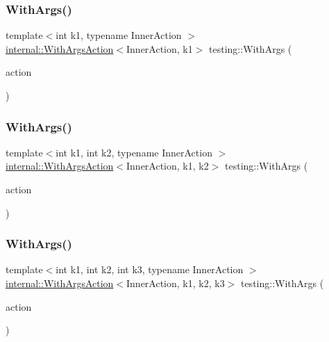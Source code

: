 \mbox{\label{namespacetesting_a3bd9eef13bee9065b19d3cd571829c7c}} 
\subsubsection{\texorpdfstring{WithArgs()}{WithArgs()}\hspace{0.1cm}{\footnotesize\ttfamily [1/11]}}
{\footnotesize\ttfamily template$<$int k1, typename Inner\+Action $>$ \\
\mbox{\hyperlink{structtesting_1_1internal_1_1_with_args_action}{internal\+::\+With\+Args\+Action}}$<$Inner\+Action, k1$>$ testing\+::\+With\+Args (\begin{DoxyParamCaption}\item[{const Inner\+Action \&}]{action }\end{DoxyParamCaption})\hspace{0.3cm}{\ttfamily [inline]}}

\mbox{\label{namespacetesting_aa82fc09250ba172220e6fb7e77249e74}} 
\subsubsection{\texorpdfstring{WithArgs()}{WithArgs()}\hspace{0.1cm}{\footnotesize\ttfamily [2/11]}}
{\footnotesize\ttfamily template$<$int k1, int k2, typename Inner\+Action $>$ \\
\mbox{\hyperlink{structtesting_1_1internal_1_1_with_args_action}{internal\+::\+With\+Args\+Action}}$<$Inner\+Action, k1, k2$>$ testing\+::\+With\+Args (\begin{DoxyParamCaption}\item[{const Inner\+Action \&}]{action }\end{DoxyParamCaption})\hspace{0.3cm}{\ttfamily [inline]}}

\mbox{\label{namespacetesting_a999614cb785165b9a44a9a95a3753407}} 
\subsubsection{\texorpdfstring{WithArgs()}{WithArgs()}\hspace{0.1cm}{\footnotesize\ttfamily [3/11]}}
{\footnotesize\ttfamily template$<$int k1, int k2, int k3, typename Inner\+Action $>$ \\
\mbox{\hyperlink{structtesting_1_1internal_1_1_with_args_action}{internal\+::\+With\+Args\+Action}}$<$Inner\+Action, k1, k2, k3$>$ testing\+::\+With\+Args (\begin{DoxyParamCaption}\item[{const Inner\+Action \&}]{action }\end{DoxyParamCaption})\hspace{0.3cm}{\ttfamily [inline]}}


